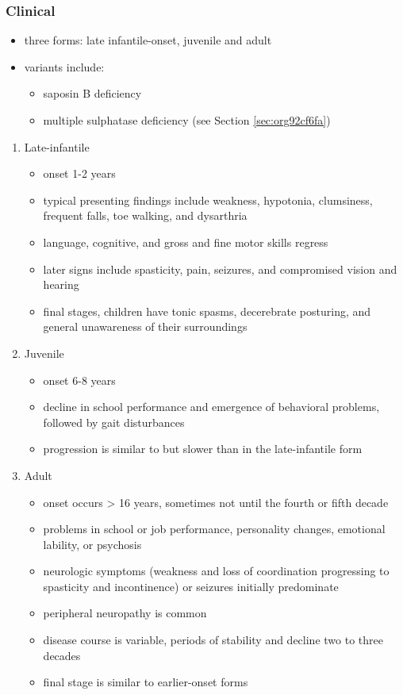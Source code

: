 \documentclass[12pt]{scrartcl}
\begin{document}
\subsubsection{Clinical}
\label{sec:org4bc6926}
\begin{itemize}
\item three forms: late infantile-onset, juvenile and adult
\item variants include:
\begin{itemize}
\item saposin B deficiency
\item multiple sulphatase deficiency (see Section \ref{sec:org92cf6fa})
\end{itemize}
\end{itemize}
\begin{enumerate}
\item Late-infantile
\label{sec:org56359d8}
\begin{itemize}
\item onset 1-2 years
\item typical presenting findings include weakness, hypotonia, clumsiness, frequent falls, toe walking, and dysarthria
\item language, cognitive, and gross and fine motor skills regress
\item later signs include spasticity, pain, seizures, and compromised vision and hearing
\item final stages, children have tonic spasms, decerebrate posturing, and
general unawareness of their surroundings
\end{itemize}

\item Juvenile
\label{sec:orgde83597}
\begin{itemize}
\item onset 6-8 years
\item decline in school performance and emergence of behavioral problems, followed by gait disturbances
\item progression is similar to but slower than in the late-infantile form
\end{itemize}

\item Adult
\label{sec:orgd438ac8}
\begin{itemize}
\item onset occurs \textgreater{} 16 years, sometimes not until the fourth or fifth decade
\item problems in school or job performance, personality changes, emotional lability, or psychosis
\item neurologic symptoms (weakness and loss of coordination progressing
to spasticity and incontinence) or seizures initially
predominate
\item peripheral neuropathy is common
\item disease course is variable, periods of stability and decline two to three decades
\item final stage is similar to earlier-onset forms
\end{itemize}
\end{enumerate}
\end{document}
